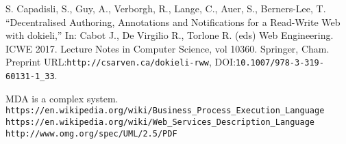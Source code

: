 \documentclass[conference,a4paper]{IEEEtran}
\providecommand\url[1]{\texttt{#1}}
\begin{document}
\begin{thebibliography}{11}
  S.  Capadisli, S., Guy, A., Verborgh, R., Lange, C., Auer, S., Berners-Lee, T. ``Decentralised Authoring, Annotations and Notifications for a Read-Write Web with dokieli,'' In: Cabot J., De Virgilio R., Torlone R. (eds) Web Engineering. ICWE 2017. Lecture Notes in Computer Science, vol 10360. Springer, Cham. Preprint URL:\url{http://csarven.ca/dokieli-rww}, DOI:\url{10.1007/978-3-319-60131-1_33}.



MDA is a complex system.
 \url{https://en.wikipedia.org/wiki/Business_Process_Execution_Language}
 \url{https://en.wikipedia.org/wiki/Web_Services_Description_Language}
 \url{http://www.omg.org/spec/UML/2.5/PDF}
\end{thebibliography}




\end{document}
